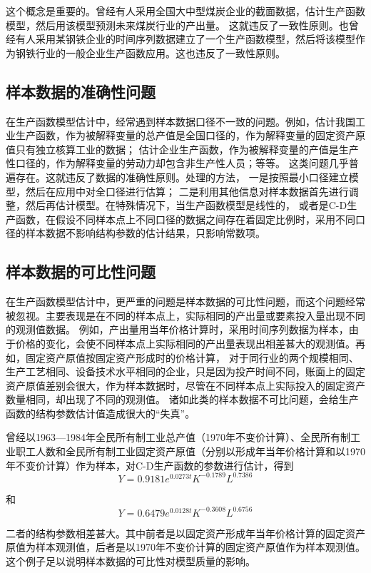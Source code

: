 这个概念是重要的。曾经有人采用全国大中型煤炭企业的截面数据，估计生产函数模型，然后用该模型预测未来煤炭行业的产出量。
这就违反了一致性原则。也曾经有人采用某钢铁企业的时间序列数据建立了一个生产函数模型，然后将该模型作为钢铁行业的一般企业生产函数应用。这也违反了一致性原则。
	 
\subsection{样本数据的准确性问题}
	
在生产函数模型估计中，经常遇到样本数据口径不一致的问题。例如，估计我国工业生产函数，作为被解释变量的总产值是全国口径的，作为解释变量的固定资产原值只有独立核算工业的数据；
估计企业生产函数，作为被解释变量的产值是生产性口径的，作为解释变量的劳动力却包含非生产性人员；等等。
这类问题几乎普遍存在。这就违反了数据的准确性原则。处理的方法，
一是按照最小口径建立模型，然后在应用中对全口径进行估算；
二是利用其他信息对样本数据首先进行调整，然后再估计模型。在特殊情况下，当生产函数模型是线性的，
或者是C-D生产函数，在假设不同样本点上不同口径的数据之间存在着固定比例时，采用不同口径的样本数据不影响结构参数的估计结果，只影响常数项。
	
\subsection{样本数据的可比性问题} 
	
在生产函数模型估计中，更严重的问题是样本数据的可比性问题，而这个问题经常被忽视。主要表现是在不同的样本点上，实际相同的产出量或要素投入量出现不同的观测值数据。
例如，产出量用当年价格计算时，采用时间序列数据为样本，由于价格的变化，会使不同样本点上实际相同的产出量表现出相差甚大的观测值。再如，固定资产原值按固定资产形成时的价格计算，
对于同行业的两个规模相同、生产工艺相同、设备技术水平相同的企业，只是因为投产时间不同，账面上的固定资产原值差别会很大，作为样本数据时，尽管在不同样本点上实际投入的固定资产数量相同，却出现了不同的观测值。
诸如此类的样本数据不可比问题，会给生产函数的结构参数估计值造成很大的“失真”。

曾经以1963—1984年全民所有制工业总产值（1970年不变价计算）、全民所有制工业职工人数和全民所有制工业固定资产原值（分别以形成年当年价格计算和以1970年不变价计算）作为样本，对C-D生产函数的参数进行估计，得到
$$ Y=0.9181 e^{0.0273 t} K^{-0.1789} L^{0.7386} $$

和
$$ Y=0.6479 e^{0.0128 t} K^{-0.3608} L^{0.6756} $$

二者的结构参数相差甚大。其中前者是以固定资产形成年当年价格计算的固定资产原值为样本观测值，后者是以1970年不变价计算的固定资产原值作为样本观测值。这个例子足以说明样本数据的可比性对模型质量的影响。
	
